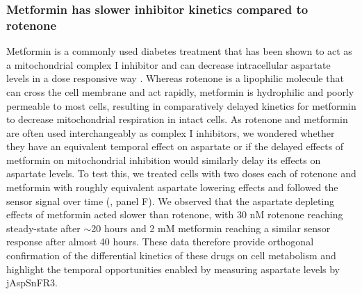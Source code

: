 \documentclass[9pt,lineno]{elife}
\begin{document}
\subsubsection{Metformin has slower inhibitor kinetics compared to rotenone}
Metformin is a commonly used diabetes treatment that has been shown to act as a mitochondrial complex I inhibitor \citep{Owen2000-ri, El-Mir2000-qm, Andrzejewski2014-wm, Wheaton2014-ka} and can decrease intracellular aspartate levels in a dose responsive way \citep{Gui2016-ca}.
Whereas rotenone is a lipophilic molecule that can cross the cell membrane and act rapidly, metformin is hydrophilic and poorly permeable to most cells, resulting in comparatively delayed kinetics for metformin to decrease mitochondrial respiration in intact cells.
As rotenone and metformin are often used interchangeably as complex I inhibitors, we wondered whether they have an equivalent temporal effect on aspartate or if the delayed effects of metformin on mitochondrial inhibition would similarly delay its effects on aspartate levels.
To test this, we treated cells with two doses each of rotenone and metformin with roughly equivalent aspartate lowering effects and followed the sensor signal over time (, panel F).
We observed that the aspartate depleting effects of metformin acted slower than rotenone, with 30 nM rotenone reaching steady-state after $\sim$20 hours and 2 mM metformin reaching a similar sensor response after almost 40 hours.
These data therefore provide orthogonal confirmation of the differential kinetics of these drugs on cell metabolism and highlight the temporal opportunities enabled by measuring aspartate levels by jAspSnFR3.
\end{document}
